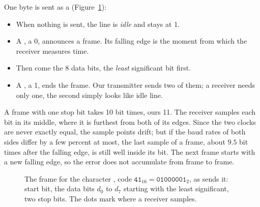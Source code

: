 One byte is sent as a  (Figure~\ref{fig:step06-frame}):
\begin{itemize}
\item When nothing is sent, the line is \emph{idle} and stays at 1.
\item A , a 0, announces a frame. Its falling edge is the
  moment from which the receiver measures time.
\item Then come the 8 data bits, the \emph{least} significant bit first.
\item A , a 1, ends the frame. Our transmitter sends two of
  them; a receiver needs only one, the second simply looks like idle line.
\end{itemize}
A frame with one stop bit takes 10 bit times, ours 11. The receiver samples
each bit in its middle, where it is furthest from both of its edges. Since the
two clocks are never exactly equal, the sample points drift; but if the baud
rates of both sides differ by a few percent at most, the last sample of a
frame, about $9.5$ bit times after the falling edge, is still well inside its
bit. The next frame starts with a new falling edge, so the error does not
accumulate from frame to frame.

\begin{figure}[ht]
\centering
{}
\caption{The frame for the character , code $\mathtt{41}_{16} =
\mathtt{01000001}_2$, as  sends it: start bit, the data bits
$d_0$ to $d_7$ starting with the least significant, two stop bits. The dots
mark where a receiver samples.}
\label{fig:step06-frame}
\end{figure}

